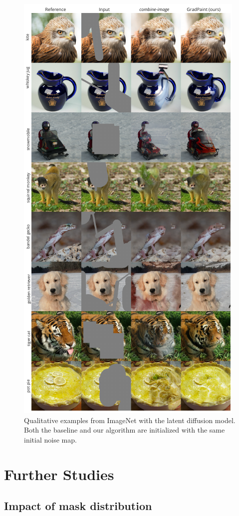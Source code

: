 \begin{figure}[H]
  \centering
  \includegraphics[width=0.8\linewidth]{images/gradpaint/in_latent_samples.pdf} %
  \caption{Qualitative examples from ImageNet with the latent diffusion model. Both the baseline and our algorithm are initialized with the same initial noise map.}
\label{fig:qualitative_latent_imagenet}
\end{figure}


\section{Further Studies}


\subsection{Impact of mask distribution} \label{ood_mask}

